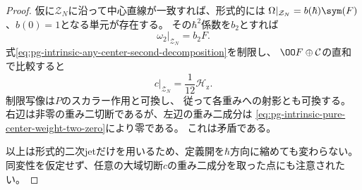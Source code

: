 \begin{proof}
仮に$\mathcal Z_N$に沿って中心直線が一致すれば、形式的には
$\Omega|_{\mathcal Z_N}=b(\hbar)\sym(F)$、$b(0)=1$となる単元が存在する。
その$\hbar^2$係数を$b_2$とすれば
\begin{equation}
 \omega_2|_{\mathcal Z_N}=b_2F.
 \label{eq:pg-intrinsic-line-matching-second-coefficient}
\end{equation}
式\eqref{eq:pg-intrinsic-any-center-second-decomposition}を制限し、
$\OO F\oplus\mathcal C$の直和で比較すると
\begin{equation}
 c|_{\mathcal Z_N}=\frac1{12}\mathscr H_{\mathrm z}.
 \label{eq:pg-intrinsic-zero-impossible-extension}
\end{equation}
制限写像は$P$のスカラー作用と可換し、
従って各重みへの射影とも可換する。
右辺は非零の重み二切断であるが、左辺の重み二成分は
\eqref{eq:pg-intrinsic-pure-center-weight-two-zero}により零である。
これは矛盾である。

以上は形式的二次jetだけを用いるため、定義開を$\hbar$方向に縮めても変わらない。
同変性を仮定せず、任意の大域切断$c$の重み二成分を取った点にも注意されたい。
\end{proof}

